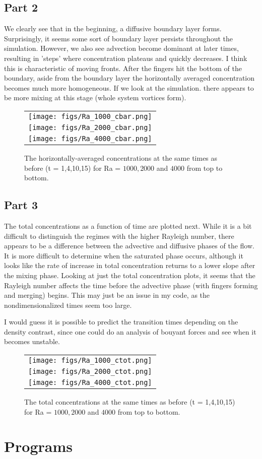\documentclass{article}
\begin{document}
\subsection{Part 2}
We clearly see that in the beginning, a diffusive boundary layer forms.
Surprisingly, it seems some sort of boundary layer persists throughout the simulation.
However, we also see advection become dominant at later times, resulting in 'steps' where concentration plateaus and quickly decreases.
I think this is characteristic of moving fronts.
After the fingers hit the bottom of the boundary, aside from the boundary layer the horizontally averaged concentration becomes much more homogeneous.
If we look at the simulation. there appears to be more mixing at this stage (whole system vortices form).
\begin{figure}[!h]
\centering
\begin{tabular}{c}
\texttt{[image: figs/Ra\_1000\_cbar.png]} \\
\texttt{[image: figs/Ra\_2000\_cbar.png]} \\
\texttt{[image: figs/Ra\_4000\_cbar.png]} \\
\end{tabular}
\caption{The horizontally-averaged concentrations at the same times as before (t = 1,4,10,15) for Ra = $1000, 2000$ and $4000$ from top to bottom.}
\end{figure}

\clearpage

\subsection{Part 3}
The total concentrations as a function of time are plotted next.
While it is a bit difficult to distinguish the regimes with the higher Rayleigh number, there appears to be a difference between the advective and diffusive phases of the flow.
It is more difficult to determine when the saturated phase occurs, although it looks like the rate of increase in total concentration returns to a lower slope after the mixing phase.
Looking at just the total concentration plots, it seems that the Rayleigh number affects the time before the advective phase (with fingers forming and merging) begins.
This may just be an issue in my code, as the nondimensionalized times seem too large.

I would guess it is possible to predict the transition times depending on the density contrast, since one could do an analysis of bouyant forces and see when it becomes unstable.
\begin{figure}[!h]
\centering
\begin{tabular}{c}
\texttt{[image: figs/Ra\_1000\_ctot.png]} \\
\texttt{[image: figs/Ra\_2000\_ctot.png]} \\
\texttt{[image: figs/Ra\_4000\_ctot.png]} \\
\end{tabular}
\caption{The total concentrations at the same times as before (t = 1,4,10,15) for Ra = $1000, 2000$ and $4000$ from top to bottom.}
\end{figure}


\section{Programs}


\end{document}
